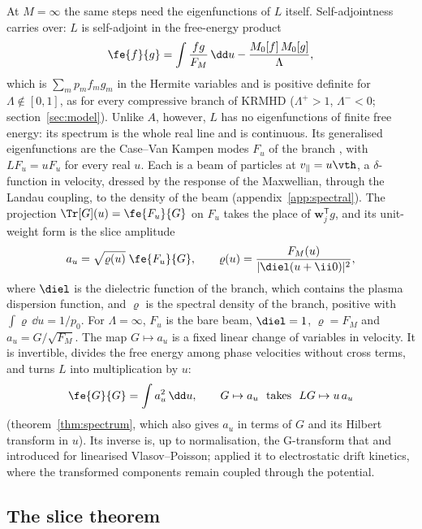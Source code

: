 At $M=\infty$ the same steps need the eigenfunctions of $L$ itself. Self-adjointness carries over: $L$ is self-adjoint in the free-energy product
\begin{equation}\label{eq:fe}
  \fe{f}{g}=\int\frac{fg}{F_M}\,\dd u-\frac{M_0[f]\,M_0[g]}{\Lambda},
\end{equation}
which is $\sum_mp_mf_mg_m$ in the Hermite variables and is positive definite for $\Lambda\notin[0,1]$, as for every compressive branch of KRMHD ($\Lambda^+>1$, $\Lambda^-<0$; section~\ref{sec:model}). Unlike $A$, however, $L$ has no eigenfunctions of finite free energy: its spectrum is the whole real line and is continuous. Its generalised eigenfunctions are the Case--Van Kampen modes $F_u$ of the branch \citep{vanKampen1955,Case1959}, with $LF_u=uF_u$ for every real $u$. Each is a beam of particles at $v_\parallel=u\vth$, a $\delta$-function in velocity, dressed by the response of the Maxwellian, through the Landau coupling, to the density of the beam (appendix~\ref{app:spectral}). The projection $\Tr[G](u)=\fe{F_u}{G}$ on $F_u$ takes the place of $\boldsymbol w_j^{\mathsf T}g$, and its unit-weight form is the slice amplitude
\begin{equation}\label{eq:aunit}
  a_u=\sqrt{\varrho(u)}\;\fe{F_u}{G},\qquad \varrho(u)=\frac{F_M(u)}{|\diel(u+\ii0)|^2},
\end{equation}
where $\diel$ is the dielectric function of the branch, which contains the plasma dispersion function, and $\varrho$ is the spectral density of the branch, positive with $\int\varrho\,\dd u=1/p_0$. For $\Lambda=\infty$, $F_u$ is the bare beam, $\diel=1$, $\varrho=F_M$ and $a_u=G/\sqrt{F_M}$. The map $G\mapsto a_u$ is a fixed linear change of variables in velocity. It is invertible, divides the free energy among phase velocities without cross terms, and turns $L$ into multiplication by $u$:
\begin{equation}\label{sl:parseval}
  \fe{G}{G}=\int a_u^2\,\dd u,\qquad G\mapsto a_u\ \text{ takes }\ LG\mapsto u\,a_u
\end{equation}
(theorem~\ref{thm:spectrum}, which also gives $a_u$ in terms of $G$ and its Hilbert transform in $u$). Its inverse is, up to normalisation, the G-transform that \citet{MorrisonPfirsch1992} and \citet{Morrison2000} introduced for linearised Vlasov--Poisson; \citet{Heninger2018} applied it to electrostatic drift kinetics, where the transformed components remain coupled through the potential.

\subsection{The slice theorem}\label{sl:slicesec}

